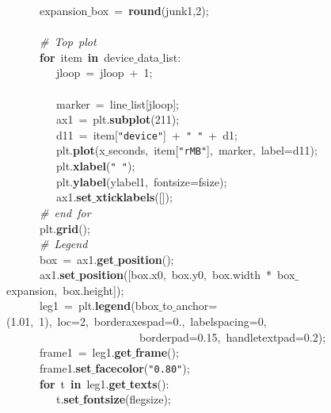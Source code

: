 \mbox{}\ \ \ \ \ \ expansion$\_$box\ =\ \textbf{round}(junk1,2); \\
\mbox{}\ \ \ \ \ \  \\
\mbox{}\ \ \ \ \ \ \textit{\#\ Top\ plot} \\
\mbox{}\ \ \ \ \ \ \textbf{for}\ item\ \textbf{in}\ device$\_$data$\_$list: \\
\mbox{}\ \ \ \ \ \ \ \ \ jloop\ =\ jloop\ +\ 1; \\
\mbox{}\ \ \ \ \ \ \ \ \  \\
\mbox{}\ \ \ \ \ \ \ \ \ marker\ =\ line$\_$list[jloop]; \\
\mbox{}\ \ \ \ \ \ \ \ \ ax1\ =\ plt.\textbf{subplot}(211); \\
\mbox{}\ \ \ \ \ \ \ \ \ d11\ =\ item[\texttt{"{}device"{}}]\ +\ \texttt{"{}\ "{}}\ +\ d1; \\
\mbox{}\ \ \ \ \ \ \ \ \ plt.\textbf{plot}(x$\_$seconds,\ item[\texttt{"{}rMB"{}}],\ marker,\ label=d11); \\
\mbox{}\ \ \ \ \ \ \ \ \ plt.\textbf{xlabel}(\texttt{"{}\ "{}}); \\
\mbox{}\ \ \ \ \ \ \ \ \ plt.\textbf{ylabel}(ylabel1,\ fontsize=fsize); \\
\mbox{}\ \ \ \ \ \ \ \ \ ax1.\textbf{set$\_$xticklabels}([]);\  \\
\mbox{}\ \ \ \ \ \ \textit{\#\ end\ for} \\
\mbox{}\ \ \ \ \ \ plt.\textbf{grid}(); \\
\mbox{}\ \ \ \ \ \ \textit{\#\ Legend} \\
\mbox{}\ \ \ \ \ \ box\ =\ ax1.\textbf{get$\_$position}(); \\
\mbox{}\ \ \ \ \ \ ax1.\textbf{set$\_$position}([box.x0,\ box.y0,\ box.width\ *\ box$\_$expansion,\ box.height]); \\
\mbox{}\ \ \ \ \ \ leg1\ =\ plt.\textbf{legend}(bbox$\_$to$\_$anchor=(1.01,\ 1),\ loc=2,\ borderaxespad=0.,\ labelspacing=0,\  \\
\mbox{}\ \ \ \ \ \ \ \ \ \ \ \ \ \ \ \ \ \ \ \ \ \ \ \ borderpad=0.15,\ handletextpad=0.2); \\
\mbox{}\ \ \ \ \ \ frame1\ =\ leg1.\textbf{get$\_$frame}(); \\
\mbox{}\ \ \ \ \ \ frame1.\textbf{set$\_$facecolor}(\texttt{"{}0.80"{}}); \\
\mbox{}\ \ \ \ \ \ \textbf{for}\ t\ \textbf{in}\ leg1.\textbf{get$\_$texts}(): \\
\mbox{}\ \ \ \ \ \ \ \ \ t.\textbf{set$\_$fontsize}(flegsize); \\
